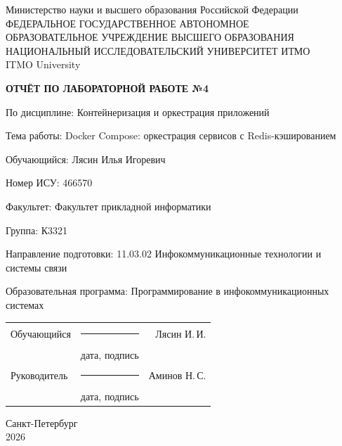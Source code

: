 \documentclass[14pt,a4paper,oneside]{extreport}
\newcommand{\LabNumber}{4}
\newcommand{\LabTitle}{Docker Compose: оркестрация сервисов с Redis-кэшированием}
\newcommand{\CourseName}{Контейнеризация и оркестрация приложений}
\newcommand{\StudentName}{Лясин Илья Игоревич}
\newcommand{\StudentShortName}{Лясин И.\,И.}
\newcommand{\StudentISU}{466570}
\newcommand{\StudentGroup}{К3321}
\newcommand{\FacultyName}{Факультет прикладной информатики}
\newcommand{\DegreeProgramme}{11.03.02 Инфокоммуникационные технологии и системы связи}
\newcommand{\EducationProgramme}{Программирование в инфокоммуникационных системах}
\newcommand{\TeacherName}{Аминов Н.\,С.}
\newcommand{\ReportCity}{Санкт-Петербург}
\newcommand{\ReportYear}{2026}
\begin{document}
\begin{titlepage}
  \thispagestyle{empty}
  \begin{center}
    \fontsize{12pt}{16pt}\selectfont
    Министерство науки и высшего образования Российской Федерации\\[0.25\baselineskip]
    ФЕДЕРАЛЬНОЕ ГОСУДАРСТВЕННОЕ АВТОНОМНОЕ\\
    ОБРАЗОВАТЕЛЬНОЕ УЧРЕЖДЕНИЕ ВЫСШЕГО ОБРАЗОВАНИЯ\\[0.25\baselineskip]
    НАЦИОНАЛЬНЫЙ ИССЛЕДОВАТЕЛЬСКИЙ УНИВЕРСИТЕТ ИТМО\\
    ITMO University
  \end{center}
  \vspace{0.8\baselineskip}
  \begin{center}
    \textbf{ОТЧЁТ ПО ЛАБОРАТОРНОЙ РАБОТЕ №\LabNumber}
  \end{center}
  \vspace{0.4\baselineskip}
  \begingroup
  \setlength{\parindent}{0pt}
  По дисциплине: \CourseName\par\medskip
  Тема работы: \LabTitle\par\medskip
  Обучающийся: \StudentName\par\medskip
  Номер ИСУ: \StudentISU\par\medskip
  Факультет: \FacultyName\par\medskip
  Группа: \StudentGroup\par\medskip
  Направление подготовки: \DegreeProgramme\par\medskip
  Образовательная программа: \EducationProgramme\par
  \endgroup
  \vfill
  \begin{tabularx}{\textwidth}{@{}l>{\centering\arraybackslash}Xr@{}}
    Обучающийся & \rule{25mm}{0.4pt} & \StudentShortName\\
    & {\fontsize{12pt}{14pt}\selectfont дата, подпись} &\\[0.4\baselineskip]
    Руководитель & \rule{25mm}{0.4pt} & \TeacherName\\
    & {\fontsize{12pt}{14pt}\selectfont дата, подпись} &
  \end{tabularx}
  \vfill
  \begin{center}
    \ReportCity\\
    \ReportYear
  \end{center}
\end{titlepage}
\setcounter{page}{2}
\tableofcontents

\end{document}
